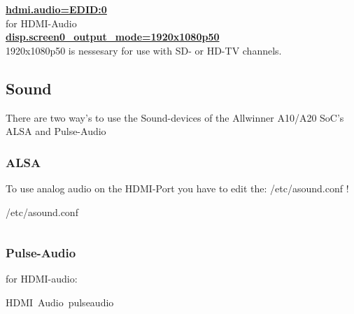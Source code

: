 \documentclass[11pt, a4paper,ngerman]{article}
\begin{document}
\color{monoorange}
\underline{\textbf{hdmi.audio=EDID:0}} \\
\color{black}
for HDMI-Audio \\

\color{monoorange}
\underline{\textbf{disp.screen0\_output\_mode=1920x1080p50}} \\
\color{black}
1920x1080p50 is nessesary for use with SD- or HD-TV channels. \\


\newpage %
\subsection{Sound}

There are two way's to use the Sound-devices of the Allwinner A10/A20 SoC's\\

ALSA and Pulse-Audio \\
\subsubsection{ALSA}

To use analog audio on the HDMI-Port you have to edit the: /etc/asound.conf !\\

\begin{mintedbox}[breakable=true,
 bottomrule=0.5mm,
 width=\paperwidth-3cm,
 boxsep=1mm, 
 enhanced=true,
 colframe = monoblack,
 drop fuzzy shadow,
 colback = black
 ]{/etc/asound.conf}%
 

     \inputminted[firstline=3,lastline=32, 
     linenos=true, framesep=2mm, mathescape, numbersep=5pt,tabsize=4,%
]{apacheconf}{includes/asound.conf}%

\end{mintedbox}%
\vspace{0.2cm}


\subsubsection{Pulse-Audio}

for HDMI-audio: \\

\begin{mintedbox}[breakable=true,
 bottomrule=0.5mm,
 width=\paperwidth-3cm,
 boxsep=1mm, 
 enhanced=true,
 colframe = monoblack,
 drop fuzzy shadow,
 colback = black
 ]{HDMI\ Audio\ pulseaudio}%
 

     \inputminted[firstline=3,lastline=3, 
     linenos=true, framesep=2mm, mathescape, numbersep=5pt,tabsize=4,%
]{bash}{includes/pulseaudio.sh}%

\end{mintedbox}%
\vspace{0.2cm}
\end{document}
